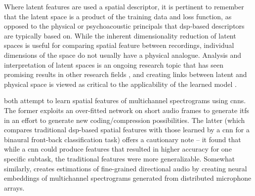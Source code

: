 \documentclass[referee,pdflatex,sn-mathphys-num]{sn-jnl}%
\newcommand{\citeauthorandyear}[1]{\citeauthor{#1}, \citeyear{#1}}
\begin{document}
\begin{figure}[htb!]
{
}
\end{figure}

Where latent features are used a spatial descriptor, it is pertinent to remember that the latent space is a product of the training data and loss function, as opposed to the physical or psychoacoustic principals that \gls{dsp}-based descriptors are typically based on. While the inherent dimensionality reduction of latent spaces is useful for comparing spatial feature between recordings, individual dimensions of the space do not usually have a physical analogue. Analysis and interpretation of latent spaces is an ongoing research topic that has seen promising results in other research fields \cite{bornemannLatentSpaceAnalysisImproved2022,mccormickLatentSpacesSeeing2025,nguyenDeepLearningaidedInverse2026}, and creating links between latent and physical space is viewed as critical to the applicability of the learned model \cite{bousquetAutoEncodersLatentSpace2025}.

\cite{huangParametricSpatialAudio2018,zielinskiAutomaticDiscriminationFront2022} both attempt to learn spatial features of multichannel spectrograms using \glspl{cnn}. The former exploits an over-fitted network on short audio frames to generate \glspl{itf} in an effort to generate new coding/compression possibilities. The latter (which compares traditional \gls{dsp}-based spatial features with those learned by a \gls{cnn} for a binaural front-back classification task) offers a cautionary note -- it found that while a \gls{cnn} could produce features that resulted in higher accuracy for one specific subtask, the traditional features were more generalizable. Somewhat similarly, \cite{kongNeuralSoundField2022} creates estimations of fine-grained directional audio by creating neural embeddings of multichannel spectrograms generated from distributed microphone arrays.
\end{document}
